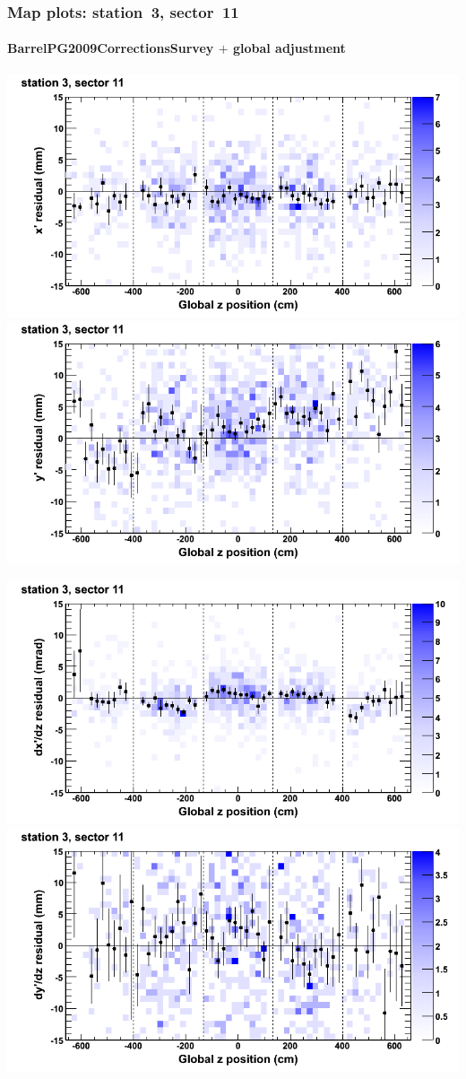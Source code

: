 \documentclass[compress]{beamer}
\begin{document}
\begin{frame}
\frametitle{Map plots: station~3, sector~11}
\framesubtitle{BarrelPG2009CorrectionsSurvey $+$ global adjustment}
\includegraphics[width=0.5\linewidth]{mapplots_re01/DTvsz_st3sec11_x.png}
\includegraphics[width=0.5\linewidth]{mapplots_re01/DTvsz_st3sec11_y.png}

\includegraphics[width=0.5\linewidth]{mapplots_re01/DTvsz_st3sec11_dxdz.png}
\includegraphics[width=0.5\linewidth]{mapplots_re01/DTvsz_st3sec11_dydz.png}
\end{frame}
\end{document}
